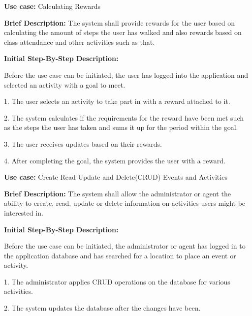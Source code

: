 ﻿\documentclass{article}
\begin{document}
\begin{flushleft}
    \textbf{Use case:} Calculating Rewards  
    \newline
    	
    \textbf{Brief Description:}
    \newline
    The system shall provide rewards for the user based on calculating the amount of steps the user has walked and also rewards based on class attendance and other activities such as that.
    \newline
    
    \textbf{Initial Step-By-Step Description:}
    
    Before the use case can be initiated, the user has logged into the application and selected an activity with a goal to meet.
	\newline    
	
1. The user selects an activity to take part in with a reward attached to it.

2. The system calculates if the requirements for the reward have been met such as the steps the user has taken and sums it up for the period within the goal. 

3. The user receives updates based on their rewards.

4. After completing the goal, the system provides the user with a reward.


\end{flushleft}

\begin{flushleft}
    \textbf{Use case:} Create Read Update and Delete(CRUD) Events and Activities  
    \newline
    	
    \textbf{Brief Description:}
    \newline
    The system shall allow the administrator or agent the ability to create, read, update or delete information on activities users might be interested in. 
    \newline
    
    \textbf{Initial Step-By-Step Description:}
    
    Before the use case can be initiated, the administrator or agent has logged in to the application database and has searched for a location to place an event or activity.
	\newline    

1. The administrator applies CRUD operations on the database for various activities.

2. The system updates the database after the changes have been.

\end{flushleft}
\end{document}
